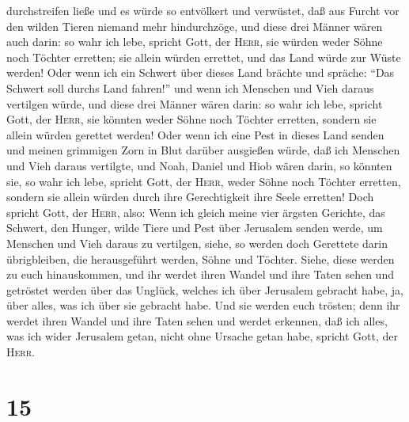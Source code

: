 durchstreifen ließe und es würde so entvölkert und verwüstet, daß aus
Furcht vor den wilden Tieren niemand mehr hindurchzöge, 
und diese drei Männer wären auch darin: so wahr ich lebe, spricht Gott,
der \textsc{Herr}, sie würden weder Söhne noch Töchter erretten; sie
allein würden errettet, und das Land würde zur Wüste werden!
 Oder wenn ich ein Schwert über dieses Land brächte und
spräche: ``Das Schwert soll durchs Land fahren!'' und wenn ich Menschen
und Vieh daraus vertilgen würde,  und diese drei Männer
wären darin: so wahr ich lebe, spricht Gott, der \textsc{Herr}, sie
könnten weder Söhne noch Töchter erretten, sondern sie allein würden
gerettet werden!  Oder wenn ich eine Pest in dieses Land
senden und meinen grimmigen Zorn in Blut darüber ausgießen würde, daß
ich Menschen und Vieh daraus vertilgte,  und Noah, Daniel
und Hiob wären darin, so könnten sie, so wahr ich lebe, spricht Gott,
der \textsc{Herr}, weder Söhne noch Töchter erretten, sondern sie allein
würden durch ihre Gerechtigkeit ihre Seele erretten! 
Doch spricht Gott, der \textsc{Herr}, also: Wenn ich gleich meine vier
ärgsten Gerichte, das Schwert, den Hunger, wilde Tiere und Pest über
Jerusalem senden werde, um Menschen und Vieh daraus zu vertilgen,
 siehe, so werden doch Gerettete darin übrigbleiben, die
herausgeführt werden, Söhne und Töchter. Siehe, diese werden zu euch
hinauskommen, und ihr werdet ihren Wandel und ihre Taten sehen und
getröstet werden über das Unglück, welches ich über Jerusalem gebracht
habe, ja, über alles, was ich über sie gebracht habe. 
Und sie werden euch trösten; denn ihr werdet ihren Wandel und ihre Taten
sehen und werdet erkennen, daß ich alles, was ich wider Jerusalem getan,
nicht ohne Ursache getan habe, spricht Gott, der \textsc{Herr}.

\hypertarget{section-14}{%
\section{15}\label{section-14}}

